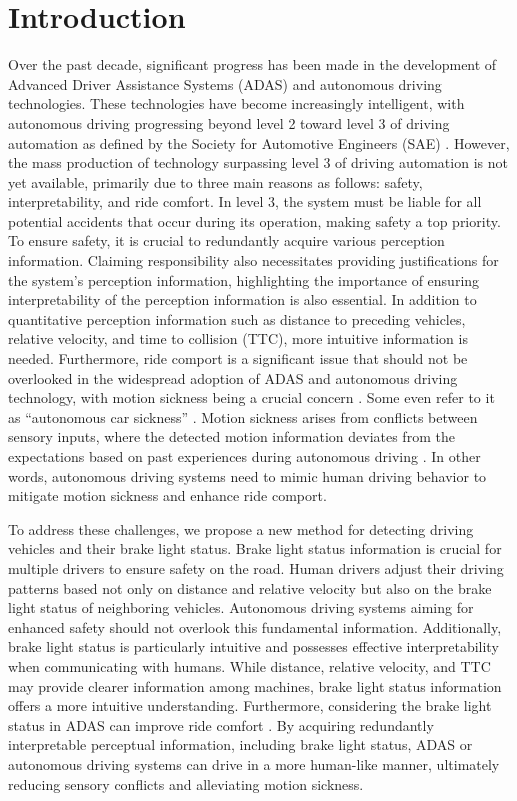 \section{Introduction}
Over the past decade, significant progress has been made in the development of Advanced Driver Assistance Systems (ADAS) and autonomous driving technologies. 
These technologies have become increasingly intelligent, with autonomous driving progressing beyond level 2 toward level 3 of driving automation as defined by the Society for Automotive Engineers (SAE) \cite{sae20213016}. 
However, the mass production of technology surpassing level 3 of driving automation is not yet available, primarily due to three main reasons as follows: safety, interpretability, and ride comfort.
In level 3, the system must be liable for all potential accidents that occur during its operation, making safety a top priority.
To ensure safety, it is crucial to redundantly acquire various perception information.
Claiming responsibility also necessitates providing justifications for the system's perception information, highlighting the importance of ensuring interpretability of the perception information is also essential.
In addition to quantitative perception information such as distance to preceding vehicles, relative velocity, and time to collision (TTC), more intuitive information is needed.
Furthermore, ride comport is a significant issue that should not be overlooked in the widespread adoption of ADAS and autonomous driving technology, with motion sickness being a crucial concern \cite{diels2016self, iskander2019car}.
Some even refer to it as ``autonomous car sickness'' \cite{iskander2019car}.
Motion sickness arises from conflicts between sensory inputs, where the detected motion information deviates from the expectations based on past experiences during autonomous driving \cite{reason1975motion,reason1978motion}.
In other words, autonomous driving systems need to mimic human driving behavior to mitigate motion sickness and enhance ride comport.

To address these challenges, we propose a new method for detecting driving vehicles and their brake light status.
Brake light status information is crucial for multiple drivers to ensure safety on the road.
Human drivers adjust their driving patterns based not only on distance and relative velocity but also on the brake light status of neighboring vehicles. 
Autonomous driving systems aiming for enhanced safety should not overlook this fundamental information.
Additionally, brake light status is particularly intuitive and possesses effective interpretability when communicating with humans.
While distance, relative velocity, and TTC may provide clearer information among machines, brake light status information offers a more intuitive understanding.
Furthermore, considering the brake light status in ADAS can improve ride comfort \cite{pirhonen2022predictive}.
By acquiring redundantly interpretable perceptual information, including brake light status, ADAS or autonomous driving systems can drive in a more human-like manner, ultimately reducing sensory conflicts and alleviating motion sickness.


